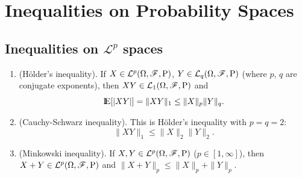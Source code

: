 \documentclass[a4paper,10pt]{scrbook}
\begin{document}
\section{Inequalities on Probability Spaces}

\subsection{Inequalities on $\mathcal{L}^p$ spaces}
\begin{enumerate}
  \item (H\"older's inequality). If $X\in\mathcal{L}^p(\Omega,\mathscr{F},\mathrm{P})$, $Y\in\mathcal{L}_q(\Omega,\mathscr{F},\mathrm{P})$ (where $p$, $q$ are conjugate exponents), then $XY\in\mathcal{L}_1(\Omega,\mathscr{F},\mathrm{P})$ and \[ \E[|XY|] = \|XY\|_1 \leq \|X\|_p \|Y\|_q.\]
 
 \item (Cauchy-Schwarz inequality). This is H\"older's inequality with $p=q=2$:
 \[
    \|XY\|_1 \leq \|X\|_2 \|Y\|_2.
 \]

 \item (Minkowski inequality). If $X,Y\in\mathcal{L}^p(\Omega,\mathscr{F},\mathrm{P})$ ($p\in [1,\infty]$), then $X+Y\in\mathcal{L}^p(\Omega,\mathscr{F},\mathrm{P})$  and 
       $\|X+Y\|_p \leq \|X\|_p + \|Y\|_p$.
\end{enumerate}
\end{document}
